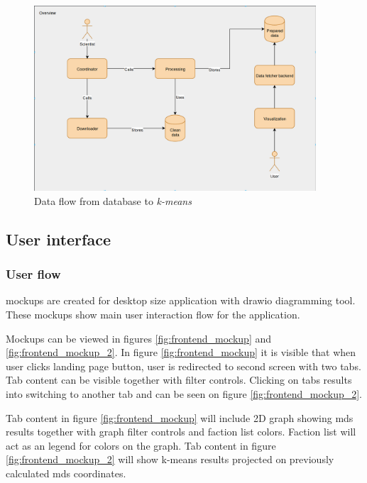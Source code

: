 \documentclass[a4paper,12pt]{article}
\begin{document}
	\begin{figure}[H]	
		\centering
		\includegraphics[width=10.5cm]{images/data_flow_overview.png}
		\caption{Data flow from database to \textit{k-means}}
		\label{fig:data_flow_pipeline}
	\end{figure}
	
	\vspace{1cm}
	
	\clearpage
	
	\subsection{User interface}
	
	\subsubsection{User flow}
	
	\glspl{mockup} are created for desktop size application with \gls{drawio} diagramming tool. These mockups show main user interaction flow for the application.
	
	Mockups can be viewed in figures \ref{fig:frontend_mockup} and \ref{fig:frontend_mockup_2}. In figure \ref{fig:frontend_mockup} it is visible that  when user clicks landing page button, user is redirected to second screen with two tabs. Tab content can be visible together with filter controls. Clicking on tabs results into switching to another tab and can be seen on figure \ref{fig:frontend_mockup_2}. 
	
	Tab content in figure \ref{fig:frontend_mockup} will include 2D graph showing \acrfull{mds} results together with graph filter controls and faction list colors. Faction list will act as an legend for colors on the graph. Tab content in figure \ref{fig:frontend_mockup_2} will show \acrshort{k-means} results projected on previously calculated \acrshort{mds} coordinates.
	
\end{document}
